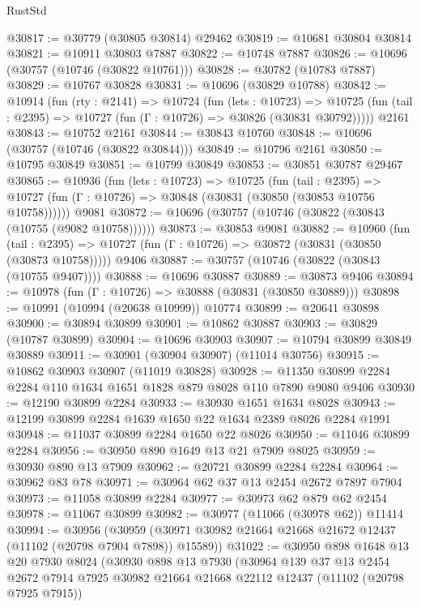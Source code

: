 \begin{lexlean}{RustStd}
\begin{coremodule}
@30817 := @30779 (@30805 @30814) @29462
@30819 := @10681 @30804 @30814
@30821 := @10911 @30803 @7887
@30822 := @10748 @7887
@30826 := @10696 (@30757 (@10746 (@30822 @10761)))
@30828 := @30782 (@10783 @7887)
@30829 := @10767 @30828
@30831 := @10696 (@30829 @10788)
@30842 := @10914
    (fun (rty : @2141) =>
    @10724
      (fun (lets : @10723) =>
      @10725 (fun (tail : @2395) => @10727 (fun (Γ : @10726) => @30826 (@30831 @30792)))))
    @2161
@30843 := @10752 @2161
@30844 := @30843 @10760
@30848 := @10696 (@30757 (@10746 (@30822 @30844)))
@30849 := @10796 @2161
@30850 := @10795 @30849
@30851 := @10799 @30849
@30853 := @30851 @30787 @29467
@30865 := @10936
    (fun (lets : @10723) =>
    @10725
      (fun (tail : @2395) =>
      @10727 (fun (Γ : @10726) => @30848 (@30831 (@30850 (@30853 @10756 @10758))))))
    @9081
@30872 := @10696 (@30757 (@10746 (@30822 (@30843 (@10755 (@9082 @10758))))))
@30873 := @30853 @9081
@30882 := @10960
    (fun (tail : @2395) => @10727 (fun (Γ : @10726) => @30872 (@30831 (@30850 (@30873 @10758)))))
    @9406
@30887 := @30757 (@10746 (@30822 (@30843 (@10755 @9407))))
@30888 := @10696 @30887
@30889 := @30873 @9406
@30894 := @10978 (fun (Γ : @10726) => @30888 (@30831 (@30850 @30889)))
@30898 := @10991 (@10994 (@20638 @10999)) @10774
@30899 := @20641 @30898
@30900 := @30894 @30899
@30901 := @10862 @30887
@30903 := @30829 (@10787 @30899)
@30904 := @10696 @30903
@30907 := @10794 @30899 @30849 @30889
@30911 := @30901 (@30904 @30907) (@11014 @30756)
@30915 := @10862 @30903 @30907 (@11019 @30828)
@30928 := @11350 @30899 @2284 @2284 @110 @1634 @1651 @1828 @879 @8028 @110 @7890 @9080 @9406
@30930 := @12190 @30899 @2284
@30933 := @30930 @1651 @1634 @8028
@30943 := @12199 @30899 @2284 @1639 @1650 @22 @1634 @2389 @8026 @2284 @1991
@30948 := @11037 @30899 @2284 @1650 @22 @8026
@30950 := @11046 @30899 @2284
@30956 := @30950 @890 @1649 @13 @21 @7909 @8025
@30959 := @30930 @890 @13 @7909
@30962 := @20721 @30899 @2284 @2284
@30964 := @30962 @83 @78
@30971 := @30964 @62 @37 @13 @2454 @2672 @7897 @7904
@30973 := @11058 @30899 @2284
@30977 := @30973 @62 @879 @62 @2454
@30978 := @11067 @30899
@30982 := @30977 (@11066 (@30978 @62)) @11414
@30994 := @30956
    (@30959 (@30971 @30982 @21664 @21668 @21672 @12437 (@11102 (@20798 @7904 @7898)) @15589))
@31022 := @30950
    @898
    @1648
    @13
    @20
    @7930
    @8024
    (@30930
      @898
      @13
      @7930
      (@30964
        @139
        @37
        @13
        @2454
        @2672
        @7914
        @7925
        @30982
        @21664
        @21668
        @22112
        @12437
        (@11102 (@20798 @7925 @7915))

\end{coremodule}
\end{lexlean}
